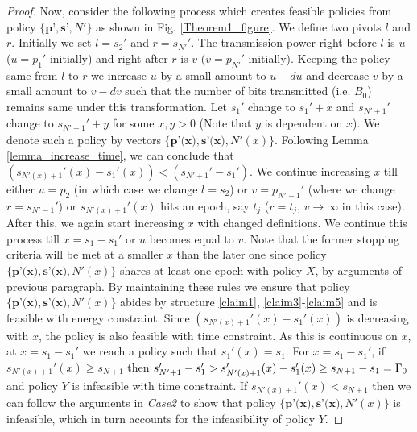\begin{proof}
Now, consider the following process which creates feasible policies from policy $\{\textbf{p'},\textbf{s'},N'\}$ as shown in Fig. \ref{Theorem1_figure}. We define two pivots $l$ and $r$. Initially we set $l=s_2'$ and $r=s_{N'}'$. The transmission power right before $l$ is $u$ ($u=p_1'$ initially) and right after $r$ is $v$ ($v=p_{N'}'$ initially). Keeping the policy same from $l$ to $r$ we increase $u$ by a small amount to $u+du$ and decrease $v$ by a small amount to $v-dv$ such that the number of bits transmitted (i.e. $B_0$) remains same under this transformation. Let $s_1'$ change to $s_1'+x$ and $s_{N'+1}'$ change to $s_{N'+1}'+y$ for some $x,y>0$ (Note that $y$ is dependent on $x$). We denote such a policy by vectors $\{\textbf{p'(x)},\textbf{s'(x)},N'(x)\}$. Following Lemma \ref{lemma_increase_time}, we can conclude that $(s_{N'(x)+1}'(x)-s_1'(x))<(s_{N'+1}'-s_1')$. We continue increasing $x$ till either $u=p_2$ (in which case we change $l=s_2$) or $v=p_{N'-1}'$ (where we change $r=s_{N'-1}'$) or $s_{N'(x)+1}'(x)$ hits an epoch, say $t_j$ ($r=t_j$, $v\rightarrow\infty$ in this case). After this, we again start increasing $x$ with changed definitions. We continue this process till $x=s_1-s_1'$  or $u$ becomes equal to $v$. Note that the former stopping criteria will be met at a smaller $x$ than the later one since policy $\{\textbf{p'(x)},\textbf{s'(x)},N'(x)\}$ shares at least one epoch with policy $X$, by arguments of previous paragraph. By maintaining these rules we ensure that policy $\{\textbf{p'(x)},\textbf{s'(x)},N'(x)\}$ abides by structure \eqref{claim1}, \eqref{claim3}-\eqref{claim5} and is feasible with energy constraint. Since $\left( s_{N'(x)+1}'(x)-s_1'(x)\right)$ is decreasing with $x$, the policy is also feasible with time constraint. As this is continuous on $x$, at $x=s_1-s_1'$ we reach a policy such that $s_1'(x)=s_1$. For $x=s_1-s_1'$, if $s_{N'(x)+1}'(x)\ge s_{N+1}$ then $s_{N'+1}'-s_1'>s_{N'(x)+1}'(x)-s_1'(x)\ge s_{N+1}-s_1=\Gamma_0$ and policy $Y$ is infeasible with time constraint. If $s_{N'(x)+1}'(x)< s_{N+1}$ then we can follow the arguments in \textit{Case2} to show that policy $\{\textbf{p'(x)},\textbf{s'(x)},N'(x)\}$ is infeasible, which in turn accounts for the infeasibility of policy $Y$.
\end{proof}

























